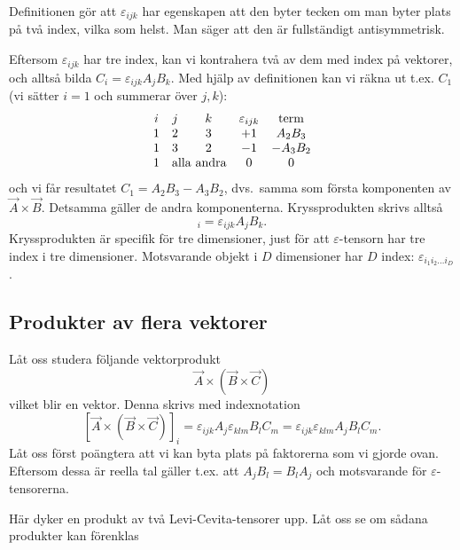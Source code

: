 \documentclass[%
oneside,                 %
final,                   %
10pt]{article}
\begin{document}
Definitionen gör att $\varepsilon_{ijk}$ har egenskapen att den byter tecken om man byter plats på två index, vilka som helst. Man säger att den är fullständigt antisymmetrisk.

Eftersom $\varepsilon_{ijk}$ har tre index, kan vi kontrahera två av dem med index på vektorer, och alltså bilda $C_i=\varepsilon_{ijk}A_jB_k$. Med hjälp av definitionen kan vi räkna ut t.ex. $C_1$ (vi sätter $i=1$ och summerar över $j,k$):
\begin{equation}
  \begin{array}{ccccc}
  	i & j & k & \varepsilon_{ijk} & \mathrm{term}\\
  	1 & 2 & 3 & +1 & A_2 B_3\\
  	1 & 3 & 2 & -1 & -A_3 B_2 \\
  	1 & \multicolumn{2}{c}{\mathrm{alla~andra}} & 0 & 0
  \end{array}
\end{equation}
och vi får resultatet $C_1=A_2B_3-A_3B_2$, dvs.~samma som första komponenten av $\vec{A}\times\vec{B}$. Detsamma gäller de andra komponenterna. Kryssprodukten skrivs alltså
\begin{equation}
[\vec{A}\times\vec{B}]_i=\varepsilon_{ijk}A_jB_k .
\end{equation}
Kryssprodukten är specifik för tre dimensioner, just för att $\varepsilon$-tensorn har tre index i tre dimensioner. Motsvarande objekt i $D$ dimensioner har $D$ index: $\varepsilon_{i_1i_2\ldots i_D}$.

\subsection*{Produkter av flera vektorer}

Låt oss studera följande vektorprodukt
\begin{equation}
  \vec{A} \times \left( \vec{B} \times \vec{C} \right)
\end{equation}
vilket blir en vektor. Denna skrivs med indexnotation
\begin{equation}
  \label{eq:ABC}
  \left[ \vec{A} \times \left( \vec{B} \times \vec{C} \right) \right]_i =
  \varepsilon_{ijk} A_j \varepsilon_{klm} B_l C_m = \varepsilon_{ijk} \varepsilon_{klm} A_j B_l C_m.
\end{equation}
Låt oss först poängtera att vi kan byta plats på faktorerna som vi gjorde ovan. Eftersom dessa är reella tal gäller t.ex. att $A_j B_l = B_l A_j$ och motsvarande för $\varepsilon$-tensorerna.

Här dyker en produkt av två Levi-Cevita-tensorer upp. Låt oss se om sådana produkter kan förenklas
\end{document}
